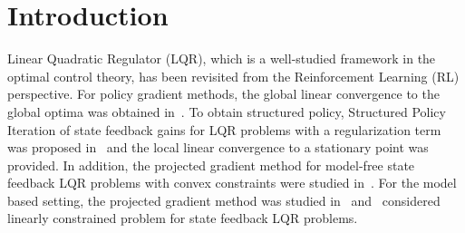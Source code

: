 % 
\section{Introduction}\label{sec:intro}



Linear Quadratic Regulator (LQR), which is a well-studied framework in the optimal control theory, has been revisited from the Reinforcement Learning (RL) perspective.
For policy gradient methods, the global linear convergence to the global optima was obtained in~\cite{fazel2018global, mohammadi2021convergence}.
To obtain structured policy, Structured Policy Iteration of state feedback gains for LQR problems with a regularization term was proposed in~\cite{park2020structured}
and the local linear convergence to a stationary point was provided.
In addition, the projected gradient method for model-free state feedback LQR problems with convex constraints were studied in~\cite{hambly2021policy}. For the model based setting, the projected gradient method was studied in~\cite{bu2019lqr} and~\cite{talebi2022policy} considered linearly constrained problem for state feedback LQR problems.


